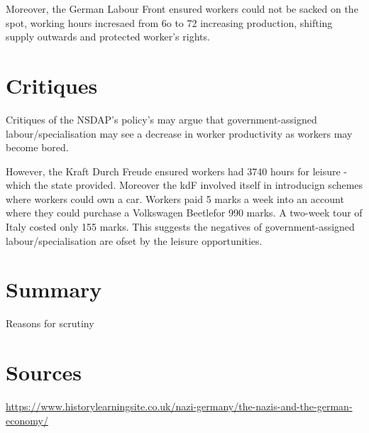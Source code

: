 \documentclass{article}
\begin{document}
Moreover, the German Labour Front ensured workers could not be sacked on the spot,
working hours incresaed from 6o to 72 increasing production, shifting supply outwards and
protected worker's rights.


\section*{Critiques}
Critiques of the NSDAP's policy's may argue that government-assigned labour/specialisation may see
a decrease in worker productivity as workers may become bored.

However, the Kraft Durch Freude ensured workers
had 3740 hours for leisure - which the state provided. Moreover the kdF involved itself in introducign schemes where
workers could own a car. Workers paid 5 marks a week into an account where they could purchase a Volkswagen Beetlefor 990
marks. A two-week tour of Italy costed only 155 marks. This suggests the negatives of
government-assigned labour/specialisation are ofset by the leisure opportunities.


\newpage

\section*{Summary}
Reasons for scrutiny

\section*{Sources}
\url{https://www.historylearningsite.co.uk/nazi-germany/the-nazis-and-the-german-economy/}
\end{document}
